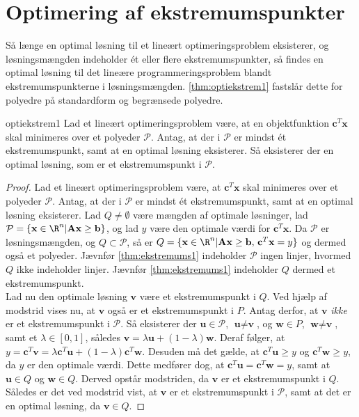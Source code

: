 \section{Optimering af ekstremumspunkter}
\label{klogskab}
%
Så længe en optimal løsning til et lineært optimeringsproblem eksisterer, og løsningsmængden indeholder ét eller flere ekstremumspunkter, så findes en optimal løsning til det lineære programmeringsproblem blandt ekstremumspunkterne i løsningsmængden. 
\ref{thm:optiekstrem1} fastslår dette for polyedre på standardform og begrænsede polyedre. 
%
\begin{thm}{}{optiekstrem1}
Lad et lineært optimeringsproblem være, at en objektfunktion $\textbf{c}^T \textbf{x}$ skal minimeres over et polyeder $\mathcal{P}$. 
Antag, at der i $\mathcal{P}$ er mindst ét ekstremumspunkt, samt at en optimal løsning eksisterer. 
Så eksisterer der en optimal løsning, som er et ekstremumspunkt i $\mathcal{P}$.
\end{thm}
%
%
\begin{proof}
Lad et lineært optimeringsproblem være, at $\textbf{c}^T \textbf{x}$ skal minimeres over et polyeder $\mathcal{P}$. 
Antag, at der i $\mathcal{P}$ er mindst ét ekstremumspunkt, samt at en optimal løsning eksisterer. 
Lad $Q \neq \emptyset $ være mængden af optimale løsninger, lad $\mathcal{P} = \{\textbf{x} \in \R^n | \textbf{A}\textbf{x} \geq \textbf{b} \}$, og lad $y$ være den optimale værdi for $\textbf{c}^T \textbf{x}$. 
Da $\mathcal{P}$ er løsningsmængden, og $Q \subset \mathcal{P}$, så er $Q = \{\textbf{x} \in \R^n | \textbf{A}\textbf{x} \geq \textbf{b} \text{, } \textbf{c}^T \textbf{x} = y \}$ og dermed også et polyeder. 
Jævnfør \ref{thm:ekstremums1} indeholder $\mathcal{P}$ ingen linjer, hvormed $Q$ ikke indeholder linjer. 
Jævnfør \ref{thm:ekstremums1} indeholder $Q$ dermed et ekstremumspunkt. \\
Lad nu den optimale løsning $\textbf{v}$ være et ekstremumspunkt i $Q$. 
Ved hjælp af modstrid vises nu, at $\textbf{v}$ også er et ekstremumspunkt i $P$. 
Antag derfor, at $\textbf{v}$ \textit{ikke} er et ekstremumspunkt i $\mathcal{P}$. 
Så eksisterer der $\textbf{u} \in \mathcal{P}$, $\textbf{u} \neq \textbf{v}$, og $\textbf{w} \in P$, $\textbf{w} \neq \textbf{v}$, samt et $\lambda \in [0,1]$, således $ \textbf{v} = \lambda \textbf{u} + (1 - \lambda) \textbf{w}$. 
Deraf følger, at $y = \textbf{c}^T \textbf{v} =  \lambda \textbf{c}^T \textbf{u} + (1 - \lambda) \textbf{c}^T \textbf{w}$. 
Desuden må det gælde, at $\textbf{c}^T \textbf{u} \geq y$ og $\textbf{c}^T \textbf{w} \geq y$, da $y$ er den optimale værdi. 
Dette medfører dog, at $ \textbf{c}^T \textbf{u} = \textbf{c}^T \textbf{w} = y$, samt at $\textbf{u} \in Q$ og $\textbf{w} \in Q$. 
Derved opstår modstriden, da $\textbf{v}$ er et ekstremumspunkt i $Q$. 
Således er det ved modstrid vist, at $\textbf{v}$ er et ekstremumspunkt i $\mathcal{P}$, samt at det er en optimal løsning, da $\textbf{v} \in Q$. 
\end{proof}\\
